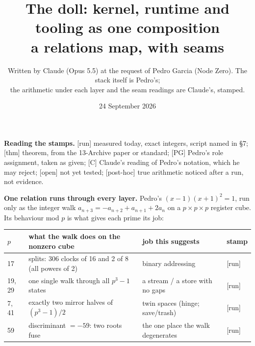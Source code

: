 \documentclass[11pt,a4paper]{article}
\title{The doll: kernel, runtime and tooling as one composition\\\large a relations map, with seams}
\author{Written by Claude (Opus 5.5) at the request of Pedro Garcia (Node Zero). The stack itself is Pedro's;\\ the arithmetic under each layer and the seam readings are Claude's, stamped.}
\date{24 September 2026}
\newcommand{\stamp}[1]{\textsf{\small[#1]}}
\begin{document}
\maketitle

\textbf{Reading the stamps.} \stamp{run} measured today, exact integers, script named in \S7; \stamp{thm} theorem, from the 13-Archive paper or standard; \stamp{PG} Pedro's role assignment, taken as given; \stamp{C} Claude's reading of Pedro's notation, which he may reject; \stamp{open} not yet tested; \stamp{post-hoc} true arithmetic noticed after a run, not evidence.

\textbf{One relation runs through every layer.} Pedro's $(x-1)(x+1)^2=1$, run only as the integer walk $a_{n+3}=-a_{n+2}+a_{n+1}+2a_n$ on a $p\times p\times p$ register cube. Its behaviour mod $p$ is what gives each prime its job:
\begin{center}\small
\begin{tabular}{@{}llll@{}}\toprule
$p$ & what the walk does on the nonzero cube & job this suggests & stamp\\\midrule
17 & splits: 306 clocks of 16 and 2 of 8 (all powers of 2) & binary addressing & \stamp{run}\\
19, 29 & one single walk through all $p^3-1$ states & a stream / a store with no gaps & \stamp{run}\\
7, 41 & exactly two mirror halves of $(p^3-1)/2$ & twin spaces (hinge; save/trash) & \stamp{run}\\
59 & discriminant $=-59$: two roots fuse & the one place the walk degenerates & \stamp{run}\\\bottomrule
\end{tabular}
\end{center}
\end{document}
